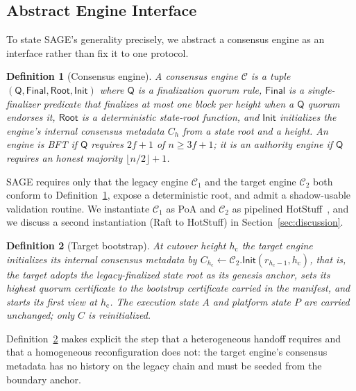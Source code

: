 \documentclass[journal]{IEEEtran}
\newtheorem{definition}{Definition}
\begin{document}
\subsection{Abstract Engine Interface}
To state SAGE's generality precisely, we abstract a consensus engine as an interface rather
than fix it to one protocol.
\begin{definition}[Consensus engine]
\label{def:engine}
A consensus engine $\mathcal{C}$ is a tuple $(\mathsf{Q}, \mathsf{Final}, \mathsf{Root},
\mathsf{Init})$ where $\mathsf{Q}$ is a finalization quorum rule, $\mathsf{Final}$ is a
single-finalizer predicate that finalizes at most one block per height when a $\mathsf{Q}$
quorum endorses it, $\mathsf{Root}$ is a deterministic state-root function, and
$\mathsf{Init}$ initializes the engine's internal consensus metadata $C_h$ from a state root
and a height. An engine is BFT if $\mathsf{Q}$ requires $2f+1$ of $n \ge 3f+1$; it is an
authority engine if $\mathsf{Q}$ requires an honest majority $\lfloor n/2\rfloor+1$.
\end{definition}
SAGE requires only that the legacy engine $\mathcal{C}_1$ and the target engine
$\mathcal{C}_2$ both conform to Definition~\ref{def:engine}, expose a deterministic root, and
admit a shadow-usable validation routine. We instantiate $\mathcal{C}_1$ as PoA and
$\mathcal{C}_2$ as pipelined HotStuff~\cite{hotstuff}, and we discuss a second instantiation
(Raft to HotStuff) in Section~\ref{sec:discussion}.

\begin{definition}[Target bootstrap]
\label{def:bootstrap}
At cutover height $h_{\mathrm{c}}$ the target engine initializes its internal consensus
metadata by $C_{h_{\mathrm{c}}} \gets \mathcal{C}_2.\mathsf{Init}(r_{h_{\mathrm{c}}-1},
h_{\mathrm{c}})$, that is, the target adopts the legacy-finalized state root as its genesis
anchor, sets its highest quorum certificate to the bootstrap certificate carried in the
manifest, and starts its first view at $h_{\mathrm{c}}$. The execution state $A$ and platform
state $P$ are carried unchanged; only $C$ is reinitialized.
\end{definition}
Definition~\ref{def:bootstrap} makes explicit the step that a heterogeneous handoff requires
and that a homogeneous reconfiguration does not: the target engine's consensus metadata has no
history on the legacy chain and must be seeded from the boundary anchor.
\end{document}
